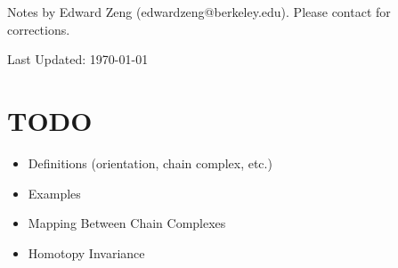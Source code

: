 \def\topic{Simplicial Homology}



    \begin{center}
        \color{blue}
        \textsf{Notes by Edward Zeng (edwardzeng@berkeley.edu). Please contact for corrections.}

        \color{red}
        \textsf{Last Updated: \today}
    \end{center}

    
    

    \newpage
    \section{TODO}
    \begin{itemize}
        \item Definitions (orientation, chain complex, etc.)
        \item Examples
        \item Mapping Between Chain Complexes
        \item Homotopy Invariance
    \end{itemize}


